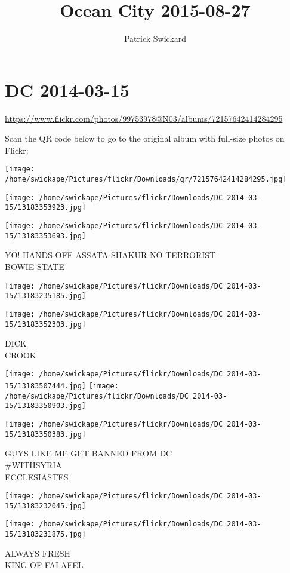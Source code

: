 \documentclass[10pt,letterpaper]{article}
\title{Ocean City 2015-08-27}
\author{Patrick Swickard}
\date{}
\begin{document}
\section*{DC 2014-03-15}

\url{https://www.flickr.com/photos/99753978@N03/albums/72157642414284295}

Scan the QR code below to go to the original album with full-size photos on Flickr:

\texttt{[image: /home/swickape/Pictures/flickr/Downloads/qr/72157642414284295.jpg]}
\pagebreak

\texttt{[image: /home/swickape/Pictures/flickr/Downloads/DC 2014-03-15/13183353923.jpg]}

\vspace{0.25in}
\texttt{[image: /home/swickape/Pictures/flickr/Downloads/DC 2014-03-15/13183353693.jpg]}

YO!  HANDS OFF ASSATA SHAKUR NO TERRORIST\\
BOWIE STATE
\pagebreak

\texttt{[image: /home/swickape/Pictures/flickr/Downloads/DC 2014-03-15/13183235185.jpg]}

\vspace{0.25in}
\texttt{[image: /home/swickape/Pictures/flickr/Downloads/DC 2014-03-15/13183352303.jpg]}

DICK\\
CROOK
\pagebreak

\texttt{[image: /home/swickape/Pictures/flickr/Downloads/DC 2014-03-15/13183507444.jpg]}
\texttt{[image: /home/swickape/Pictures/flickr/Downloads/DC 2014-03-15/13183350903.jpg]}

\texttt{[image: /home/swickape/Pictures/flickr/Downloads/DC 2014-03-15/13183350383.jpg]}

GUYS LIKE ME GET BANNED FROM DC\\
\#WITHSYRIA\\
ECCLESIASTES
\pagebreak

\texttt{[image: /home/swickape/Pictures/flickr/Downloads/DC 2014-03-15/13183232045.jpg]}

\vspace{0.25in}
\texttt{[image: /home/swickape/Pictures/flickr/Downloads/DC 2014-03-15/13183231875.jpg]}

ALWAYS FRESH\\
KING OF FALAFEL
\pagebreak
\end{document}
